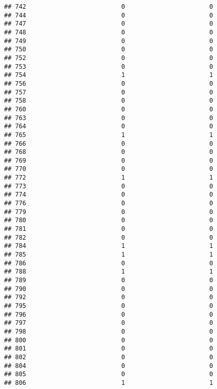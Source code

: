 \documentclass[
]{article}
\begin{document}
\begin{verbatim}
## 742                          0                       0
## 744                          0                       0
## 747                          0                       0
## 748                          0                       0
## 749                          0                       0
## 750                          0                       0
## 752                          0                       0
## 753                          0                       0
## 754                          1                       1
## 756                          0                       0
## 757                          0                       0
## 758                          0                       0
## 760                          0                       0
## 763                          0                       0
## 764                          0                       0
## 765                          1                       1
## 766                          0                       0
## 768                          0                       0
## 769                          0                       0
## 770                          0                       0
## 772                          1                       1
## 773                          0                       0
## 774                          0                       0
## 776                          0                       0
## 779                          0                       0
## 780                          0                       0
## 781                          0                       0
## 782                          0                       0
## 784                          1                       1
## 785                          1                       1
## 786                          0                       0
## 788                          1                       1
## 789                          0                       0
## 790                          0                       0
## 792                          0                       0
## 795                          0                       0
## 796                          0                       0
## 797                          0                       0
## 798                          0                       0
## 800                          0                       0
## 801                          0                       0
## 802                          0                       0
## 804                          0                       0
## 805                          0                       0
## 806                          1                       1

\end{verbatim}
\end{document}
